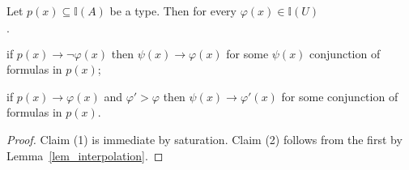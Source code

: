 \documentclass[10pt,oneside]{amsproc}
\newcommand{\mylabel}[1]{{#1}\hfill}
\renewenvironment{itemize}
  {\begin{list}{$\cdot$}{%
  \setlength{\parskip}{0mm}
  \setlength{\topsep}{.2\baselineskip}
  \setlength{\rightmargin}{0mm}
  \setlength{\listparindent}{0mm}
  \setlength{\itemindent}{0mm}
  \setlength{\labelwidth}{3ex}
  \setlength{\itemsep}{.2\baselineskip}
  \setlength{\parsep}{.2\baselineskip}
  \setlength{\partopsep}{0mm}
  \setlength{\labelsep}{1ex}
  \setlength{\leftmargin}{\labelwidth+\labelsep}
  \let\makelabel\mylabel}}{%
\end{list}}
\begin{document}
\begin{fact}\label{fact_compactness_imp}
  Let $p(x)\subseteq\mathds{I}(A)$ be a type.
  Then for every  $\varphi(x)\in\mathds{I}(U)$
  \begin{itemize}
    \item[1.] if $p(x)\rightarrow\neg\varphi(x)$ then $\psi(x)\rightarrow\varphi(x)$ for some $\psi(x)$ conjunction of formulas in $p(x)$;
    \item[2.] if $p(x)\rightarrow\varphi(x)$ and $\varphi'>\varphi$ then $\psi(x)\rightarrow\varphi'(x)$ for some conjunction of formulas in $p(x)$.
  \end{itemize} 
\end{fact}

\begin{proof}
  Claim (1) is immediate by saturation.
  Claim (2) follows from the first by Lemma~\ref{lem_interpolation}.
\end{proof}



  











\end{document}
